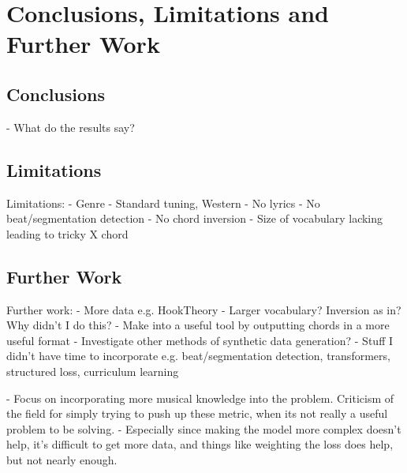 
\chapter{Conclusions, Limitations and Further Work}

\section{Conclusions}

- What do the results say?

\section{Limitations}
Limitations:
- Genre
- Standard tuning, Western
- No lyrics
- No beat/segmentation detection
- No chord inversion
- Size of vocabulary lacking leading to tricky X chord

\section{Further Work}
Further work:
- More data e.g. HookTheory
- Larger vocabulary? Inversion as in? Why didn't I do this?
- Make into a useful tool by outputting chords in a more useful format
- Investigate other methods of synthetic data generation?
- Stuff I didn't have time to incorporate e.g. beat/segmentation detection, transformers, structured loss, curriculum learning

- Focus on incorporating more musical knowledge into the problem. Criticism of the field for simply trying to push up these metric, when its not really a useful problem to be solving.
- Especially since making the model more complex doesn't help, it's difficult to get more data, and things like weighting the loss does help, but not nearly enough.